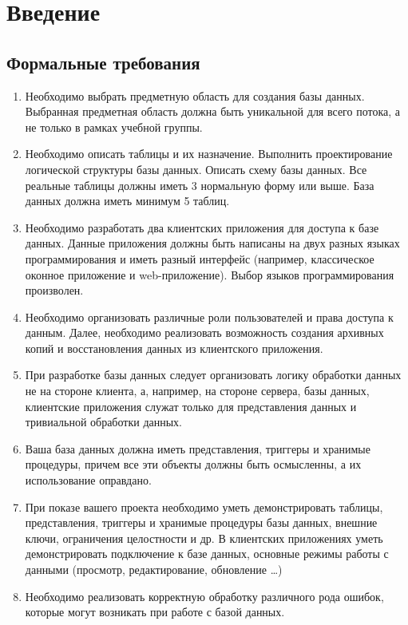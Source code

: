 \section{Введение}

\subsection{Формальные требования}
\begin{enumerate}
    \item Необходимо выбрать предметную область для создания базы данных. Выбранная предметная область должна быть уникальной для всего потока, а не только в рамках учебной группы.
    \item Необходимо описать таблицы и их назначение. Выполнить проектирование логической структуры базы данных. Описать схему базы данных. Все реальные таблицы должны иметь 3 нормальную форму или выше. База данных должна иметь минимум 5 таблиц.
    \item Необходимо разработать два клиентских приложения для доступа к базе данных. Данные приложения должны быть написаны на двух разных языках программирования и иметь разный интерфейс (например, классическое оконное приложение и web-приложение). Выбор языков программирования произволен.
    \item Необходимо организовать различные роли пользователей и права доступа к данным. Далее, необходимо реализовать возможность создания архивных копий и восстановления данных из клиентского приложения.
    \item При разработке базы данных следует организовать логику обработки данных не на стороне клиента, а, например, на стороне сервера, базы данных, клиентские приложения служат только для представления данных и тривиальной обработки данных.
    \item Ваша база данных должна иметь представления, триггеры и хранимые процедуры, причем все эти объекты должны быть осмысленны, а их использование оправдано.
    \item При показе вашего проекта необходимо уметь демонстрировать таблицы, представления, триггеры и хранимые процедуры базы данных, внешние ключи, ограничения целостности и др. В клиентских приложениях уметь демонстрировать подключение к базе данных, основные режимы работы с данными (просмотр, редактирование, обновление \dots)
    \item Необходимо реализовать корректную обработку различного рода ошибок, которые могут возникать при работе с базой данных.
\end{enumerate}

